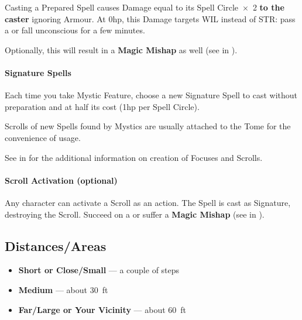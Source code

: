 \documentclass[itdr]{subfiles}
\begin{document}
Casting a Prepared Spell causes Damage equal to its Spell Circle~$\times$~2 \textbf{to the caster} ignoring Armour. At 0hp, this Damage targets WIL instead of STR: pass a  or fall unconscious for a few minutes.
\begin{dbox}
Optionally, this will result in a \textbf{Magic Mishap} as well (see \textbf{} in \textbf{}).
\end{dbox}

\vfill

\paragraph{Signature Spells}
Each time you take Mystic Feature, choose a new Signature Spell to cast without preparation and at half its cost (1hp per Spell Circle).

\vfill
\break

\begin{dbox}
	Scrolls of new Spells found by Mystics are usually attached to the Tome for the convenience of usage.
	
	See \textbf{} in \mbox{\textbf{}} for the additional information on creation of Focuses and Scrolls.
\end{dbox}


\begin{dbox}
	\paragraph{Scroll Activation (optional)}
	Any character can activate a Scroll as an action. The Spell is cast as Signature, destroying the Scroll. Succeed on a  or suffer a \textbf{Magic Mishap} (see \textbf{} in \textbf{}).
\end{dbox}

\break

\begin{dbox}
	\subsection*{Distances/Areas}
	\begin{itemize}
		\item \textbf{Short or Close/Small} --- a couple of steps
		\item \textbf{Medium} --- about 30~ft
		\item \textbf{Far/Large or Your Vicinity} --- about 60~ft
	\end{itemize}
\end{dbox}
\end{document}

